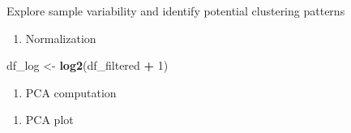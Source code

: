 \documentclass[
]{article}
\newenvironment{Shaded}{\begin{snugshade}}{\end{snugshade}}
\newcommand{\AttributeTok}[1]{\textcolor[rgb]{0.13,0.29,0.53}{#1}}
\newcommand{\ConstantTok}[1]{\textcolor[rgb]{0.56,0.35,0.01}{#1}}
\newcommand{\DecValTok}[1]{\textcolor[rgb]{0.00,0.00,0.81}{#1}}
\newcommand{\FunctionTok}[1]{\textcolor[rgb]{0.13,0.29,0.53}{\textbf{#1}}}
\newcommand{\NormalTok}[1]{#1}
\newcommand{\OtherTok}[1]{\textcolor[rgb]{0.56,0.35,0.01}{#1}}
\newcommand{\SpecialCharTok}[1]{\textcolor[rgb]{0.81,0.36,0.00}{\textbf{#1}}}
\newcommand{\StringTok}[1]{\textcolor[rgb]{0.31,0.60,0.02}{#1}}
\providecommand{\tightlist}{%
  \setlength{\itemsep}{0pt}\setlength{\parskip}{0pt}}
\begin{document}
Explore sample variability and identify potential clustering patterns

\begin{enumerate}
\def\labelenumi{\arabic{enumi})}
\tightlist
\item
  Normalization
\end{enumerate}

\begin{Shaded}
\begin{Highlighting}[]
\NormalTok{df\_log }\OtherTok{\textless{}{-}} \FunctionTok{log2}\NormalTok{(df\_filtered }\SpecialCharTok{+} \DecValTok{1}\NormalTok{)}
\end{Highlighting}
\end{Shaded}

\begin{enumerate}
\def\labelenumi{\arabic{enumi})}
\setcounter{enumi}{1}
\tightlist
\item
  PCA computation
\end{enumerate}

\begin{Shaded}
\end{Shaded}

\begin{enumerate}
\def\labelenumi{\arabic{enumi})}
\setcounter{enumi}{2}
\tightlist
\item
  PCA plot
\end{enumerate}
\end{document}
